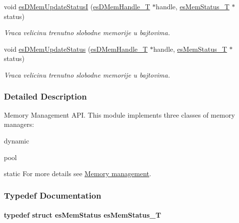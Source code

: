 \begin{DoxyCompactItemize}
void \hyperlink{group__mem__intf_gad1bddd779876d000f8906ec7ac747fa4}{es\-D\-Mem\-Update\-Status\-I} (\hyperlink{group__mem__intf_gacaaf771b18b3da8fa3b67a466390080e}{es\-D\-Mem\-Handle\-\_\-\-T} $\ast$handle, \hyperlink{group__mem__intf_ga0eb568b68247d93e2db804a681de0e9e}{es\-Mem\-Status\-\_\-\-T} $\ast$status)
\begin{DoxyCompactList}\small\item\em Vraca velicinu trenutno slobodne memorije u bajtovima. \end{DoxyCompactList}\item 
void \hyperlink{group__mem__intf_ga22ab58d97d2519dccf91220f029ac87f}{es\-D\-Mem\-Update\-Status} (\hyperlink{group__mem__intf_gacaaf771b18b3da8fa3b67a466390080e}{es\-D\-Mem\-Handle\-\_\-\-T} $\ast$handle, \hyperlink{group__mem__intf_ga0eb568b68247d93e2db804a681de0e9e}{es\-Mem\-Status\-\_\-\-T} $\ast$status)
\begin{DoxyCompactList}\small\item\em Vraca velicinu trenutno slobodne memorije u bajtovima. \end{DoxyCompactList}\end{DoxyCompactItemize}


\subsubsection{Detailed Description}
Memory Management A\-P\-I. This module implements three classes of memory managers\-:
\begin{DoxyItemize}
\item dynamic
\item pool
\item static For more details see \hyperlink{group__mem}{Memory management}. 
\end{DoxyItemize}

\subsubsection{Typedef Documentation}
\hypertarget{group__mem__intf_ga0eb568b68247d93e2db804a681de0e9e}{
\paragraph[{es\-Mem\-Status\-\_\-\-T}]{\setlength{\rightskip}{0pt plus 5cm}typedef struct {\bf es\-Mem\-Status} {\bf es\-Mem\-Status\-\_\-\-T}}}\label{group__mem__intf_ga0eb568b68247d93e2db804a681de0e9e}


